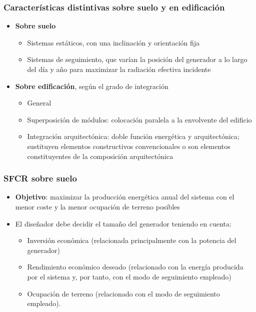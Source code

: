 \documentclass[serif, xcolor=dvipsnames]{beamer}
\begin{document}

\begin{frame}
  \frametitle{Características distintivas sobre suelo y en
    edificación}
  \begin{itemize}
  \item \textbf{Sobre suelo}

    \begin{itemize}
    \item Sistemas estáticos, con una inclinación y orientación fija
    \item Sistemas de seguimiento, que varían la posición del
      generador a lo largo del día y año para maximizar la radiación
      efectiva incidente
    \end{itemize}
  \item \textbf{Sobre edificación}, según el grado de integración

    \begin{itemize}
    \item General
    \item Superposición de módulos: colocación paralela a la
      envolvente del edificio
    \item Integración arquitectónica: doble función energética y
      arquitectónica; sustituyen elementos constructivos
      convencionales o son elementos constituyentes de la composición
      arquitectónica
    \end{itemize}
  \end{itemize}

\end{frame}
\begin{frame}
  \frametitle{SFCR sobre suelo}
  \begin{itemize}
  \item \textbf{Objetivo}: maximizar la producción energética anual
    del sistema con el menor coste y la menor ocupación de terreno
    posibles
  \item El diseñador debe decidir el tamaño del generador teniendo en
    cuenta:

    \begin{itemize}
    \item Inversión económica (relacionada principalmente con la
      potencia del generador)
    \item Rendimiento económico deseado (relacionado con la energía
      producida por el sistema y, por tanto, con el modo de
      seguimiento empleado)
    \item Ocupación de terreno (relacionado con el modo de seguimiento
      empleado).
    \end{itemize}
  \end{itemize}

\end{frame}
\end{document}
